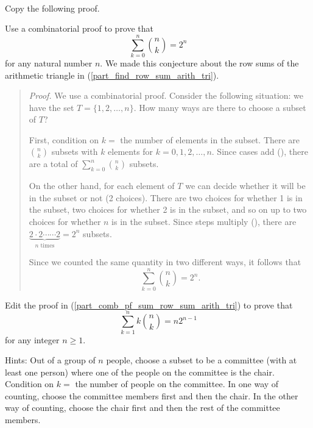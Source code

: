 \begin{act}
\label{act_comb_pf_sum}
~  
    \begin{actpart}
        \item \label{part_comb_pf_sum_row_sum_arith_tri} Copy the following proof.

            Use a combinatorial proof to prove that $$\displaystyle \sum_{k=0}^n\binom{n}{k} =2^n$$ for any natural number $n$. We made this conjecture about the row sums of the arithmetic triangle in  (\ref{part_find_row_sum_arith_tri}).
        
            \begin{quote} 
                \emph{Proof.}  We use a combinatorial proof.  Consider the following situation: we have the set $T = \{1,2,\ldots, n\}$.  How many ways are there to choose a subset of $T$?  

                First, condition on $k=$ the number of elements in the subset.  There are $\binom{n}{k}$ subsets with $k$ elements for $k = 0, 1, 2, \ldots, n$. Since cases add (), there are a total of $\displaystyle \sum_{k=0}^n\binom{n}{k}$ subsets.  
        
                On the other hand, for each element of $T$ we can decide whether it will be in the subset or not (2 choices). There are two choices for whether 1 is in the subset, two choices for whether 2 is in the subset, and so on up to two choices for whether $n$ is in the subset.  Since steps multiply (), there are $\underbrace{2\cdot 2 \cdots \cdots 2}_{n \text{ times}} = 2^n$ subsets.

                Since we counted the same quantity in two different ways, it follows that $$ \sum_{k=0}^n\binom{n}{k} =2^n.$$ 
            \end{quote}
      
        \item Edit the proof in (\ref{part_comb_pf_sum_row_sum_arith_tri}) to prove that $$\displaystyle \sum_{k=1}^nk\binom{n}{k} =n2^{n-1}$$ for any integer $n \ge 1$.  
        
        Hints: Out of a group of $n$ people, choose a subset to be a committee (with at least one person) where one of the people on the committee is the chair. Condition on $k =$ the number of people on the committee. In one way of counting, choose the committee members first and then the chair.  In the other way of counting, choose the chair first and then the rest of the committee members.      
    \end{actpart}
\end{act}

